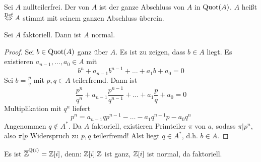\begin{df}
	Sei $A$ nullteilerfrei. Der  von $A$ ist der ganze Abschluss von $A$ in $\operatorname{Quot}(A)$. $A$ heißt  $\overset{\text{Def}}{\Leftrightarrow} A$ stimmt mit seinem ganzen Abschluss überein.
\end{df}
\begin{bem}
	Sei $A$ faktoriell. Dann ist $A$ normal.
\end{bem}
\begin{proof}
	Sei $b\in \operatorname{Quot}(A)$ ganz über $A$. Es ist zu zeigen, dass $b\in A$ liegt. Es existieren $a_{n-1}, \ldots, a_0\in A$ mit 
	$$b^n + a_{n-1} b^{n-1} + \ldots + a_1 b + a_0 =0$$
	Sei $b=\frac{p}{q}$ mit $p,q\in A$ teilerfremd. Dann ist
	$$\frac{p^n}{q^n} + a_{n-1} \frac{p^{n-1}}{q^{n-1}} + \ldots + a_1 \frac{p}{q} + a_0=0$$
	Multiplikation mit $q^n$ liefert
	$$p^n = a_{n-1}qp^{n-1} - \ldots - a_1 q^{n-1} p - a_0 q^n$$
	Angenommen $q\notin A^*$. Da $A$ faktoriell, existieren Primteiler $\pi$ von $a$, sodass $\pi |p^n$, also $\pi|p$ Widerspruch zu $p,q$ teilerfremd! Alst liegt $q\in A^*$, d.h. $b\in A$.
\end{proof}
\begin{bsp}
	Es ist $\overline {\mathbb{Z}}^{\mathbb{Q}(i)} = \mathbb{Z}[i]$, denn: $\mathbb{Z}[i]|\mathbb{Z}$ ist ganz, $\mathbb{Z}[i]$ ist normal, da faktoriell.
\end{bsp}